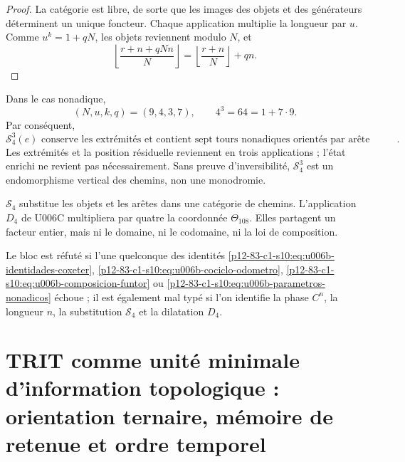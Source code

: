 {\begin{proof}
La catégorie est libre, de sorte que les images des objets et des générateurs
déterminent un unique foncteur. Chaque application multiplie la longueur par
\(u\). Comme \(u^k=1+qN\), les objets reviennent modulo \(N\), et
\[
 \left\lfloor
 \frac{r+n+qNn}{N}
 \right\rfloor
 =
 \left\lfloor\frac{r+n}{N}\right\rfloor+qn.
\]
\end{proof}

Dans le cas nonadique,
\begin{equation}
 (N,u,k,q)=(9,4,3,7),
 \qquad
 4^3=64=1+7\cdot9.
 \label{p12-83-c1-s10:eq:u006b-parametros-nonadicos}
\end{equation}
Par conséquent,
\begin{equation}
 \boxed{
 \mathcal S_4^3(e)
 \text{ conserve les extrémités et contient sept tours nonadiques
 orientés par arête initiale}.}
 \label{p12-83-c1-s10:eq:u006b-siete-vueltas}
\end{equation}
Les extrémités et la position résiduelle reviennent en trois applications ;
l’état enrichi ne revient pas nécessairement. Sans preuve
d’inversibilité, \(\mathcal S_4^3\) est un endomorphisme vertical des chemins,
non une monodromie.

\begin{remark}
\label{p12-83-c1-s10:rem:u006b-s4-no-d4}
\(\mathcal S_4\) substitue les objets et les arêtes dans une catégorie de chemins.
L’application \(D_4\) de U006C multipliera par quatre la coordonnée
\(\Theta_{108}\). Elles partagent un facteur entier, mais ni le domaine, ni le codomaine, ni la
loi de composition.
\end{remark}

\begin{criterion}
\label{p12-83-c1-s10:crit:u006b-refutacion}
Le bloc est réfuté si l’une quelconque des identités
\eqref{p12-83-c1-s10:eq:u006b-identidades-coxeter},
\eqref{p12-83-c1-s10:eq:u006b-cociclo-odometro},
\eqref{p12-83-c1-s10:eq:u006b-composicion-funtor} ou
\eqref{p12-83-c1-s10:eq:u006b-parametros-nonadicos} échoue ; il est également mal typé si l’on
identifie la phase \(C^n\), la longueur \(n\), la substitution
\(\mathcal S_4\) et la dilatation \(D_4\).
\end{criterion}
}%



\section{TRIT comme unité minimale d’information topologique : orientation ternaire, mémoire de retenue et ordre temporel}
\label{p12-83-c1-s11:chap:trit-levantado-regimenes}

